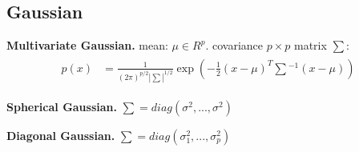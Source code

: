 \subsection{Gaussian}
\textbf{Multivariate Gaussian.}\hspace{0.2cm} mean: $\mu \in R^p$. covariance $p\times p$
matrix $\sum$:
\begin{align}
\begin{split}
	p(x) &= \frac{1}{(2\pi)^{p/2} |\sum|^{1/2}} \exp(-\frac{1}{2} (x-\mu)^T \sum {}^{-1} (x-\mu))
\end{split}
\end{align}

\textbf{Spherical Gaussian.}\hspace{0.2cm} $\sum = diag(\sigma^2, ..., \sigma^2)$

\textbf{Diagonal Gaussian.}\hspace{0.2cm} $\sum = diag(\sigma_1^2, ..., \sigma_p^2)$





















